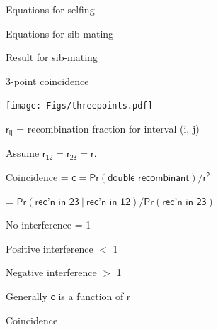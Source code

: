 \documentclass[aspectratio=169,12pt,t]{beamer}
\begin{document}
\begin{frame}[c]{Equations for selfing}


\end{frame}



\begin{frame}[c]{Equations for sib-mating}


\end{frame}


\begin{frame}[c]{Result for sib-mating}


\end{frame}



\begin{frame}[c]{3-point coincidence}

\hfill \texttt{[image: Figs/threepoints.pdf]}

\vspace*{-15mm}

  \bbi

\item $\mathsf{r_{ij}}$ = recombination fraction for interval (i, j)

{\hilit Assume $\mathsf{r_{12} = r_{23} = r}$.}

\item {\vhilit Coincidence} = $\mathsf{c = Pr(\text{double
  recombinant}) / r^2}$

\hspace{20mm} {\hilit = $\mathsf{Pr(\text{rec'n in 23} \ | \ \text{rec'n in 12}) /
  Pr(\text{rec'n in 23})}$}

\item
No interference { \hilit = 1 }

Positive interference { \hilit $<$ 1 }

Negative interference { \hilit $>$ 1  }


\item Generally {\hilit $\mathsf{c}$} is a function of {\hilit $\mathsf{r}$}

  \ei


\end{frame}



\begin{frame}[c]{Coincidence}
\end{frame}
\end{document}

